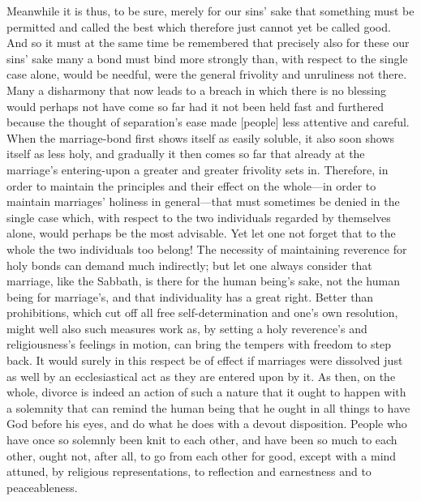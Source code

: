 \documentclass[12pt,a4paper]{book}
\begin{document}
Meanwhile it is thus, to be sure, merely for our sins' sake that something
must be permitted and called the best which therefore just cannot yet be
called good. And so it must at the same time be remembered that precisely
also for these our sins' sake many a bond must bind more strongly than,
with respect to the single case alone, would be needful, were the general
frivolity and unruliness not there. Many a disharmony that now leads to a
breach in which there is no blessing would perhaps not have come so far had
it not been held fast and furthered because the thought of separation's
ease made [people] less attentive and careful. When the marriage-bond first
shows itself as easily soluble, it also soon shows itself as less holy, and
gradually it then comes so far that already at the marriage's entering-upon
a greater and greater frivolity sets in. Therefore, in order to maintain
the principles and their effect on the whole---in order to maintain
marriages' holiness in general---that must sometimes be denied in the
single case which, with respect to the two individuals regarded by
themselves alone, would perhaps be the most advisable. Yet let one not
forget that to the whole the two individuals too belong! The necessity of
maintaining reverence for holy bonds can demand much indirectly; but let
one always consider that marriage, like the Sabbath, is there for the human
being's sake, not the human being for marriage's, and that individuality
has a great right. Better than prohibitions, which cut off all free
self-determination and one's own resolution, might well also such measures
work as, by setting a holy reverence's and religiousness's feelings in
motion, can bring the tempers with freedom to step back. It would surely in
this respect be of effect if marriages were dissolved just as well by an
ecclesiastical act as they are entered upon by it. As then, on the whole,
divorce is indeed an action of such a nature that it ought to happen with a
solemnity that can remind the human being that he ought in all things to
have God before his eyes, and do what he does with a devout disposition.
People who have once so solemnly been knit to each other, and have been so
much to each other, ought not, after all, to go from each other for good,
except with a mind attuned, by religious representations, to reflection and
earnestness and to peaceableness.
\end{document}
